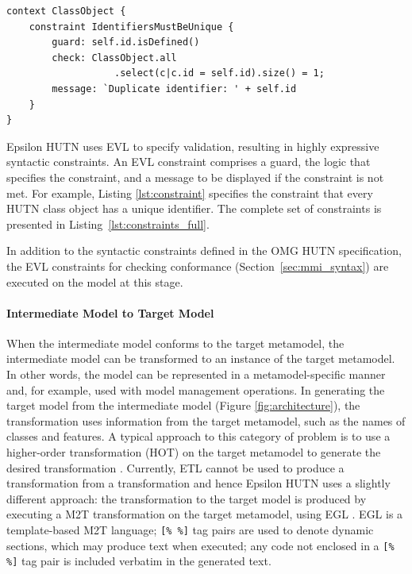 \begin{lstlisting}[caption=A constraint (in EVL) to check that all identifiers are unique., label=lst:constraint, language=EVL]
context ClassObject {
    constraint IdentifiersMustBeUnique {
        guard: self.id.isDefined()
        check: ClassObject.all
                   .select(c|c.id = self.id).size() = 1;
        message: `Duplicate identifier: ' + self.id
    }
}
\end{lstlisting}

Epsilon HUTN uses EVL \cite{kolovos08evl} to specify validation, resulting in highly expressive syntactic constraints. An EVL constraint comprises a guard, the logic that specifies the constraint, and a message to be displayed if the constraint is not met. For example, Listing \ref{lst:constraint} specifies the constraint that every HUTN class object has a unique identifier. The complete set of constraints is presented in Listing~\ref{lst:constraints_full}.

In addition to the syntactic constraints defined in the OMG HUTN specification, the EVL constraints for checking conformance (Section~\ref{sec:mmi_syntax}) are executed on the model at this stage.

\paragraph{Intermediate Model to Target Model}
When the intermediate model conforms to the target metamodel, the intermediate model can be transformed to an instance of the target metamodel. In other words, the model can be represented in a metamodel-specific manner and, for example, used with model management operations. In generating the target model from the intermediate model (Figure \ref{fig:architecture}), the transformation uses information from the target metamodel, such as the names of classes and features. A typical approach to this category of problem is to use a higher-order transformation (HOT) on the target metamodel to generate the desired transformation \cite{tisi09hot}. Currently, ETL cannot be used to produce a transformation from a transformation and hence Epsilon HUTN uses a slightly different approach: the transformation to the target model is produced by executing a M2T transformation on the target metamodel, using EGL \cite{rose08egl}. EGL is a template-based M2T language; \verb|[% %]| tag pairs are used to denote dynamic sections, which may produce text when executed; any code not enclosed in a \verb|[% %]| tag pair is included verbatim in the generated text.

